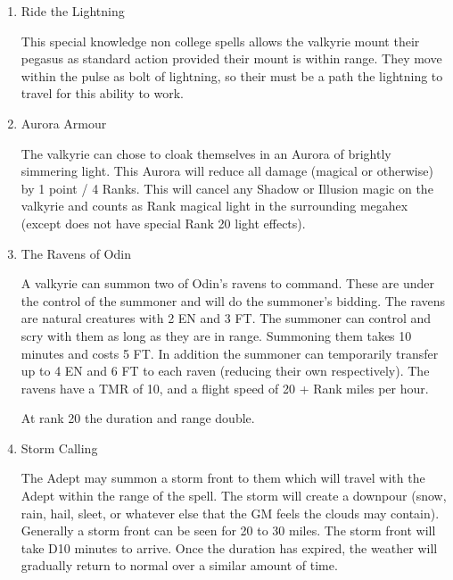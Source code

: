 \documentclass[a4paper]{article}
\begin{document}
\begin{multicols*}{3}
\begin{enumerate}
\item
\begin{spell}{Ride the Lightning}
\begin{effects}
This special knowledge non college spells allows the valkyrie mount
their pegasus as standard action provided their mount is within range.
They move within the pulse as bolt of lightning, so their must be a
path the lightning to travel for this ability to work.
\end{effects}
\end{spell}

\item 
\begin{talent}{Aurora Armour}
\begin{effects}
The valkyrie can chose to cloak themselves in an Aurora of brightly
simmering light.  This Aurora will reduce all damage (magical or
otherwise) by 1 point / 4 Ranks.  This will cancel any Shadow or
Illusion magic on the valkyrie and counts as Rank magical light in the
surrounding megahex (except does not have special Rank 20 light
effects).
\end{effects}
\end{talent}

\item
\begin{spell}{The Ravens of Odin}
\begin{effects}
A valkyrie can summon two of Odin's ravens to command.  These are
under the control of the summoner and will do the summoner's bidding.
The ravens are natural creatures with 2 EN and 3 FT.  The summoner can
control and scry with them as long as they are in range.  Summoning
them takes 10 minutes and costs 5 FT.  In addition the summoner can
temporarily transfer up to 4 EN and 6 FT to each raven (reducing their
own respectively).  The ravens have a TMR of 10, and a flight speed of
20 + Rank miles per hour.

At rank 20 the duration and range double.
\end{effects}
\end{spell}

\item
\begin{spell}{Storm Calling}
\begin{effects}
The Adept may summon a storm front to them which will travel with the
Adept within the range of the spell.  The storm will create a downpour
(snow, rain, hail, sleet, or whatever else that the GM feels the
clouds may contain). Generally a storm front can be seen for 20 to 30
miles.  The storm front will take D10 minutes to arrive.  Once the
duration has expired, the weather will gradually return to normal over
a similar amount of time.
\end{effects}
\end{spell}


\end{enumerate}
\end{multicols*}
\end{document}
